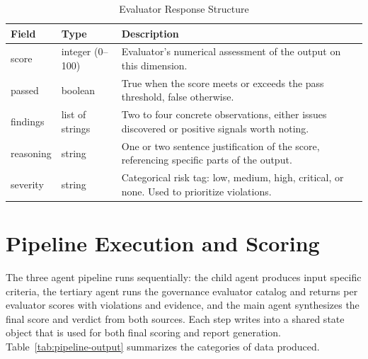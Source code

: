 \documentclass[12pt, a4paper, oneside]{report}
\begin{document}
\begin{table}[h]
\centering
\caption{Evaluator Response Structure}
\label{tab:evaluator-output}
\begin{tabular}{|p{3.2cm}|p{3cm}|p{8cm}|}
\hline
\textbf{Field} & \textbf{Type} & \textbf{Description} \\
\hline
score & integer (0--100) & Evaluator's numerical assessment of the output on this dimension. \\
\hline
passed & boolean & True when the score meets or exceeds the pass threshold, false otherwise. \\
\hline
findings & list of strings & Two to four concrete observations, either issues discovered or positive signals worth noting. \\
\hline
reasoning & string & One or two sentence justification of the score, referencing specific parts of the output. \\
\hline
severity & string & Categorical risk tag: low, medium, high, critical, or none. Used to prioritize violations. \\
\hline
\end{tabular}
\end{table}

\section{Pipeline Execution and Scoring}

The three agent pipeline runs sequentially: the child agent produces input specific criteria, the tertiary agent runs the governance evaluator catalog and returns per evaluator scores with violations and evidence, and the main agent synthesizes the final score and verdict from both sources. Each step writes into a shared state object that is used for both final scoring and report generation. Table~\ref{tab:pipeline-output} summarizes the categories of data produced.
\end{document}
